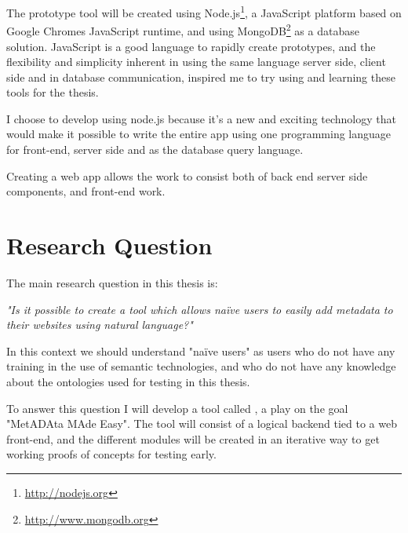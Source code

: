 The prototype tool will be created using Node.js\footnote{\url{http://nodejs.org}},
a JavaScript platform based on Google Chromes JavaScript runtime,
and using MongoDB\footnote{\url{http://www.mongodb.org}} as a database solution.
JavaScript is a good language to rapidly create prototypes, and the flexibility and simplicity inherent in using the same language
server side, client side and in database communication, inspired me to try using and learning these tools for the thesis.

%

I choose to develop using node.js because it's a new and exciting technology that would make it possible to write
the entire app using one programming language for front-end, server side and as the database query language.

Creating a web app allows the work to consist both of back end server side components, and front-end work.


\section{Research Question}
The main research question in this thesis is:

\emph{"Is it possible to create a tool which allows naïve users to easily add metadata to their websites using natural language?"}

In this context we should understand "naïve users" as users who do not have any training in the use of semantic technologies,
and who do not have any knowledge about the ontologies used for testing in this thesis.

To answer this question I will develop a tool called \theartefact, a play on the goal "MetADAta MAde Easy".
The tool will consist of a logical backend tied to a web front-end,
and the different modules will be created in an iterative way to get working proofs of concepts for testing early.

